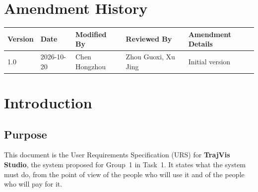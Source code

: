 \documentclass[12pt,a4paper]{report}
\begin{document}
\chapter*{Amendment History}

\begin{table}[H]
  \centering
  \setlength{\tabcolsep}{4.5pt}
  \begin{tabular}{@{}p{1.4cm} p{1.9cm} p{2.7cm} p{3.4cm} >{\raggedright\arraybackslash}p{4.9cm}@{}}
    \toprule[1.5pt]
    \textbf{Version} & \textbf{Date} & \textbf{Modified By} &
      \textbf{Reviewed By} & \textbf{Amendment Details} \\
    \midrule
    1.0 & 2026-10-20 & Chen Hongzhou & Zhou Guoxi, Xu Jing &
      Initial version \\
    \bottomrule[1.5pt]
  \end{tabular}
\end{table}

\tableofcontents
\listoffigures
{}
\listoftables
{}

\chapter{Introduction}
\label{ch:intro}

\section{Purpose}
\label{sec:purpose}

This document is the User Requirements Specification (URS) for
\textbf{TrajVis Studio}, the system proposed for Group~1 in
Task~1. It states what the system must do, from the point of view of the
people who will use it and of the people who will pay for it.
\end{document}
